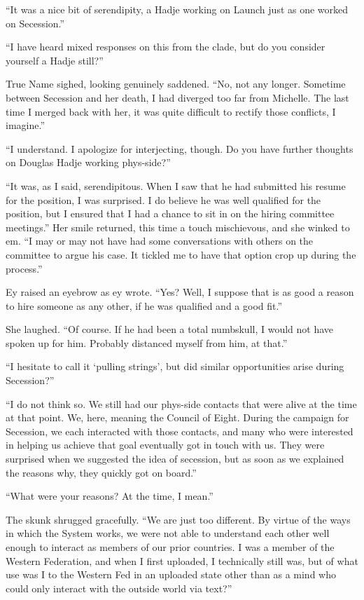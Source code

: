 ``It was a nice bit of serendipity, a Hadje working on Launch just as one worked on Secession.''

``I have heard mixed responses on this from the clade, but do you consider yourself a Hadje still?''

True Name sighed, looking genuinely saddened. ``No, not any longer. Sometime between Secession and her death, I had diverged too far from Michelle. The last time I merged back with her, it was quite difficult to rectify those conflicts, I imagine.''

``I understand. I apologize for interjecting, though. Do you have further thoughts on Douglas Hadje working phys-side?''

``It was, as I said, serendipitous. When I saw that he had submitted his resume for the position, I was surprised. I do believe he was well qualified for the position, but I ensured that I had a chance to sit in on the hiring committee meetings.'' Her smile returned, this time a touch mischievous, and she winked to em. ``I may or may not have had some conversations with others on the committee to argue his case. It tickled me to have that option crop up during the process.''

Ey raised an eyebrow as ey wrote. ``Yes? Well, I suppose that is as good a reason to hire someone as any other, if he was qualified and a good fit.''

She laughed. ``Of course. If he had been a total numbskull, I would not have spoken up for him. Probably distanced myself from him, at that.''

``I hesitate to call it `pulling strings', but did similar opportunities arise during Secession?''

``I do not think so. We still had our phys-side contacts that were alive at the time at that point. We, here, meaning the Council of Eight. During the campaign for Secession, we each interacted with those contacts, and many who were interested in helping us achieve that goal eventually got in touch with us. They were surprised when we suggested the idea of secession, but as soon as we explained the reasons why, they quickly got on board.''

``What were your reasons? At the time, I mean.''

The skunk shrugged gracefully. ``We are just too different. By virtue of the ways in which the System works, we were not able to understand each other well enough to interact as members of our prior countries. I was a member of the Western Federation, and when I first uploaded, I technically still was, but of what use was I to the Western Fed in an uploaded state other than as a mind who could only interact with the outside world via text?''

